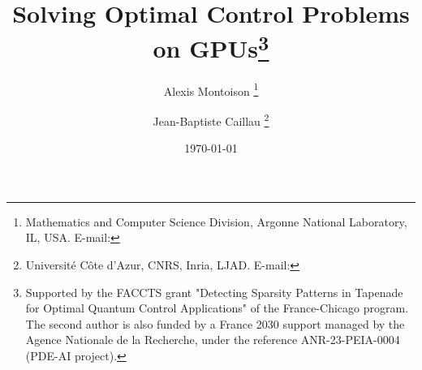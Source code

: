 \documentclass[twoside,leqno,twocolumn]{article}
\begin{document}
%
\newcommand\relatedversion{}


\title{%
  Solving Optimal Control Problems on GPUs\thanks{%
  Supported by the FACCTS grant "Detecting Sparsity Patterns in Tapenade for Optimal Quantum Control Applications" of the France-Chicago program. The second author is also funded by a France 2030 support managed by the Agence Nationale de la Recherche, under the reference ANR-23-PEIA-0004 (PDE-AI project).}
}

\author{%
  Alexis Montoison%
  \thanks{%
    Mathematics and Computer Science Division, Argonne National Laboratory, IL, USA.
    E-mail: 
  }
  \and
  Jean-Baptiste Caillau%
  \thanks{%
    Universit\'e C\^ote d'Azur, CNRS, Inria, LJAD.
    E-mail: 
  }
}
\date{\today}

\maketitle




\end{document}

